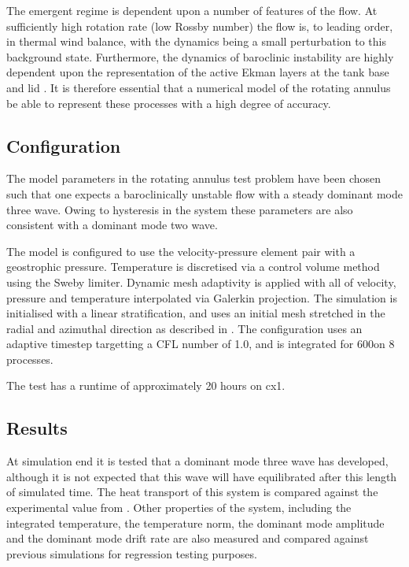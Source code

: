 The emergent regime is dependent upon a number of features of the flow. At
sufficiently high rotation rate (low Rossby number) the flow is, to leading
order, in thermal wind balance, with the dynamics being a small perturbation to
this background state. Furthermore, the dynamics of baroclinic instability are
highly dependent upon the representation of the active Ekman layers at the tank
base and lid \citep{hide1969}. It is therefore essential that a numerical model
of the rotating annulus be able to represent these processes with a high degree
of accuracy.

\subsection{Configuration}

The model parameters in the rotating annulus test problem have been chosen such
that one expects a baroclinically unstable flow with a steady dominant mode three
wave. Owing to hysteresis in the system these parameters are also consistent with
a dominant mode two wave.

The model is configured to use the \Poo velocity-pressure element pair with a \Ptwo
geostrophic pressure. Temperature is discretised via a control volume method using
the Sweby limiter. Dynamic mesh adaptivity is applied with all of velocity, pressure
and temperature interpolated via Galerkin projection. The simulation is initialised
with a linear stratification, and uses an initial mesh stretched in
the radial and azimuthal direction as described in \citet{farnell1975}. The
configuration uses an adaptive timestep targetting a CFL number of 1.0, and is
integrated for 600\s[] on 8 processes.

The test has a runtime of approximately 20 hours on cx1.

\subsection{Results}

At simulation end it is tested that a dominant mode three wave has developed,
although it is not expected that this wave will have equilibrated after this
length of simulated time. The heat transport of this system is compared against
the experimental value from \citet{read2003}. Other properties of the system,
including the integrated temperature, the temperature \Ltwo norm, the dominant
mode amplitude and the dominant mode drift rate are also measured and compared
against previous simulations for regression testing purposes.

